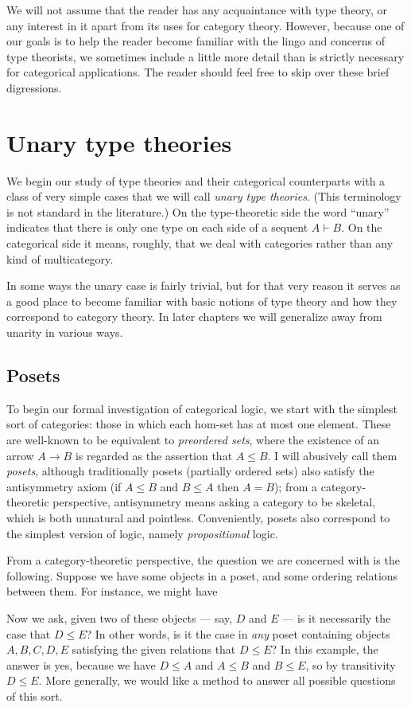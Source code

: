 \documentclass{book}
\let\types\vdash
\begin{document}
We will not assume that the reader has any acquaintance with type theory, or any interest in it apart from its uses for category theory.
However, because one of our goals is to help the reader become familiar with the lingo and concerns of type theorists, we sometimes include a little more detail than is strictly necessary for categorical applications.
The reader should feel free to skip over these brief digressions.


\chapter{Unary type theories}
\label{chap:unary}

We begin our study of type theories and their categorical counterparts with a class of very simple cases that we will call \emph{unary type theories}.
(This terminology is not standard in the literature.)
On the type-theoretic side the word ``unary'' indicates that there is only one type on each side of a sequent $A\types B$.
On the categorical side it means, roughly, that we deal with categories rather than any kind of multicategory.

In some ways the unary case is fairly trivial, but for that very reason it serves as a good place to become familiar with basic notions of type theory and how they correspond to category theory.
In later chapters we will generalize away from unarity in various ways.


\section{Posets}
\label{sec:poset}

To begin our formal investigation of categorical logic, we start with the simplest sort of categories: those in which each hom-set has at most one element.
These are well-known to be equivalent to \emph{preordered sets}, where the existence of an arrow $A\to B$ is regarded as the assertion that $A\le B$.
I will abusively call them \emph{posets}, although traditionally posets (partially ordered sets) also satisfy the antisymmetry axiom (if $A\le B$ and $B\le A$ then $A=B$); from a category-theoretic perspective, antisymmetry means asking a category to be skeletal, which is both unnatural and pointless.
Conveniently, posets also correspond to the simplest version of logic, namely \emph{propositional} logic.

From a category-theoretic perspective, the question we are concerned with is the following.
Suppose we have some objects in a poset, and some ordering relations between them.
For instance, we might have
Now we ask, given two of these objects --- say, $D$ and $E$ --- is it necessarily the case that $D\le E$?
In other words, is it the case in \emph{any} poset containing objects $A,B,C,D,E$ satisfying the given relations that $D\le E$?
In this example, the answer is yes, because we have $D\le A$ and  $A\le B$ and $B\le E$, so by transitivity $D\le E$.
More generally, we would like a method to answer all possible questions of this sort.
\end{document}
